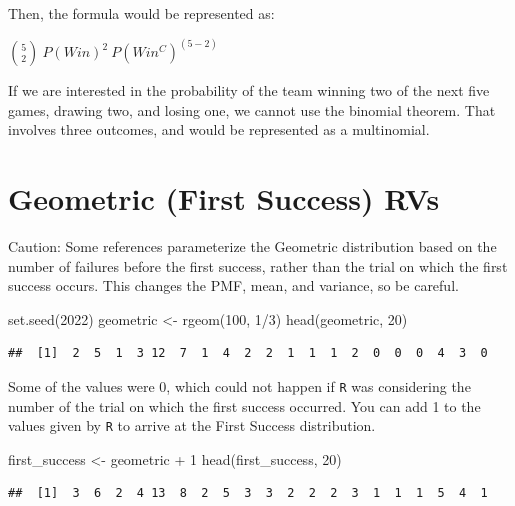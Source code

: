 \documentclass[
  11pt,
]{book}
\newenvironment{Shaded}{\begin{snugshade}}{\end{snugshade}}
\newcommand{\DecValTok}[1]{\textcolor[rgb]{0.00,0.00,0.81}{#1}}
\newcommand{\FunctionTok}[1]{\textcolor[rgb]{0.00,0.00,0.00}{#1}}
\newcommand{\NormalTok}[1]{#1}
\newcommand{\OtherTok}[1]{\textcolor[rgb]{0.56,0.35,0.01}{#1}}
\newcommand{\SpecialCharTok}[1]{\textcolor[rgb]{0.00,0.00,0.00}{#1}}
\theoremstyle{definition}
\theoremstyle{definition}
\theoremstyle{definition}
\theoremstyle{definition}
\theoremstyle{remark}
\begin{document}
Then, the formula would be represented as:

\(\binom{5}{2}\ P(Win)^2\  P(Win^C)^{(5-2)}\)

If we are interested in the probability of the team winning two of the next five games, drawing two, and losing one, we cannot use the binomial theorem. That involves three outcomes, and would be represented as a multinomial.

\hypertarget{geometric-first-success-rvs-1}{%
\section{Geometric (First Success) RVs}\label{geometric-first-success-rvs-1}}

Caution: Some references parameterize the Geometric distribution based on the number of failures before the first success, rather than the trial on which the first success occurs. This changes the PMF, mean, and variance, so be careful.

\begin{Shaded}
\begin{Highlighting}[]
\FunctionTok{set.seed}\NormalTok{(}\DecValTok{2022}\NormalTok{)}
\NormalTok{geometric }\OtherTok{\textless{}{-}} \FunctionTok{rgeom}\NormalTok{(}\DecValTok{100}\NormalTok{, }\DecValTok{1}\SpecialCharTok{/}\DecValTok{3}\NormalTok{)}
\FunctionTok{head}\NormalTok{(geometric, }\DecValTok{20}\NormalTok{)}
\end{Highlighting}
\end{Shaded}

\begin{verbatim}
##  [1]  2  5  1  3 12  7  1  4  2  2  1  1  1  2  0  0  0  4  3  0
\end{verbatim}

Some of the values were 0, which could not happen if \texttt{R} was considering the number of the trial on which the first success occurred. You can add 1 to the values given by \texttt{R} to arrive at the First Success distribution.

\begin{Shaded}
\begin{Highlighting}[]
\NormalTok{first\_success }\OtherTok{\textless{}{-}}\NormalTok{ geometric }\SpecialCharTok{+} \DecValTok{1}
\FunctionTok{head}\NormalTok{(first\_success, }\DecValTok{20}\NormalTok{)}
\end{Highlighting}
\end{Shaded}

\begin{verbatim}
##  [1]  3  6  2  4 13  8  2  5  3  3  2  2  2  3  1  1  1  5  4  1
\end{verbatim}
\end{document}
